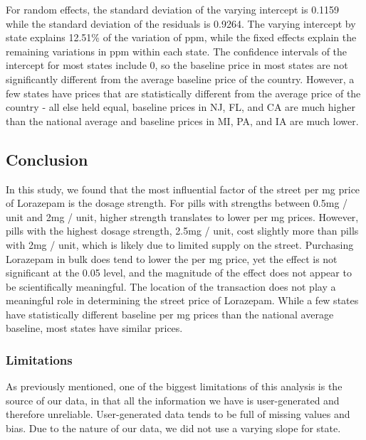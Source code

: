 \documentclass[
]{article}
\begin{document}
For random effects, the standard deviation of the varying intercept is
0.1159 while the standard deviation of the residuals is 0.9264. The
varying intercept by state explains 12.51\% of the variation of ppm,
while the fixed effects explain the remaining variations in ppm within
each state. The confidence intervals of the intercept for most states
include 0, so the baseline price in most states are not significantly
different from the average baseline price of the country. However, a few
states have prices that are statistically different from the average
price of the country - all else held equal, baseline prices in NJ, FL,
and CA are much higher than the national average and baseline prices in
MI, PA, and IA are much lower.

\hypertarget{conclusion}{%
\subsection{Conclusion}\label{conclusion}}

In this study, we found that the most influential factor of the street
per mg price of Lorazepam is the dosage strength. For pills with
strengths between 0.5mg / unit and 2mg / unit, higher strength
translates to lower per mg prices. However, pills with the highest
dosage strength, 2.5mg / unit, cost slightly more than pills with 2mg /
unit, which is likely due to limited supply on the street. Purchasing
Lorazepam in bulk does tend to lower the per mg price, yet the effect is
not significant at the 0.05 level, and the magnitude of the effect does
not appear to be scientifically meaningful. The location of the
transaction does not play a meaningful role in determining the street
price of Lorazepam. While a few states have statistically different
baseline per mg prices than the national average baseline, most states
have similar prices.

\hypertarget{limitations}{%
\subsubsection{Limitations}\label{limitations}}

As previously mentioned, one of the biggest limitations of this analysis
is the source of our data, in that all the information we have is
user-generated and therefore unreliable. User-generated data tends to be
full of missing values and bias. Due to the nature of our data, we did
not use a varying slope for state.

\newpage
\end{document}
